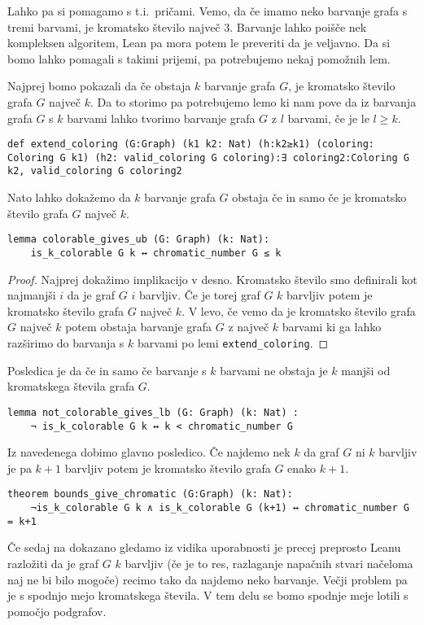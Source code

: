 \documentclass[mat1]{fmfdelo}
\begin{document}
Lahko pa si pomagamo s t.i.\ pričami. Vemo, da če imamo neko barvanje grafa s tremi barvami, je kromatsko število največ 3. 
Barvanje lahko poišče nek kompleksen algoritem, Lean pa mora potem le preveriti da je veljavno. Da si bomo lahko pomagali s takimi
prijemi, pa potrebujemo nekaj pomožnih lem. 

Najprej bomo pokazali da če obstaja $k$ barvanje grafa $G$, je kromatsko število grafa $G$ največ $k$. Da to storimo pa potrebujemo
lemo ki nam pove da iz barvanja grafa $G$ s $k$ barvami lahko tvorimo barvanje grafa $G$ z $l$ barvami, če je le $l\geq k$.
\begin{lstlisting}
def extend_coloring (G:Graph) (k1 k2: Nat) (h:k2≥k1) (coloring: Coloring G k1) (h2: valid_coloring G coloring):∃ coloring2:Coloring G k2, valid_coloring G coloring2
\end{lstlisting}
Nato lahko dokažemo da $k$ barvanje grafa $G$ obstaja če in samo če je kromatsko število grafa $G$ največ $k$.
\begin{lstlisting}
lemma colorable_gives_ub (G: Graph) (k: Nat):
    is_k_colorable G k ↔ chromatic_number G ≤ k
\end{lstlisting}
\begin{proof}
Najprej dokažimo implikacijo v desno. Kromatsko število smo definirali kot najmanjši $i$ da je graf $G$ $i$ barvljiv.
Če je torej graf $G$ $k$ barvljiv potem je kromatsko število grafa $G$ največ $k$.
V levo, če vemo da je kromatsko število grafa $G$ največ $k$ potem obstaja barvanje grafa $G$ z največ $k$ barvami
ki ga lahko razširimo do barvanja s $k$ barvami po lemi \lstinline{extend_coloring}.
\end{proof}

Posledica je da če in samo če barvanje s $k$ barvami ne obstaja je $k$ manjši od kromatskega števila grafa $G$.
\begin{lstlisting}
lemma not_colorable_gives_lb (G: Graph) (k: Nat) :
    ¬ is_k_colorable G k ↔ k < chromatic_number G
\end{lstlisting}

Iz navedenega dobimo glavno posledico.
Če najdemo nek $k$ da graf $G$ ni $k$ barvljiv je pa $k+1$ barvljiv potem je kromatsko število grafa $G$ enako $k+1$.
\begin{lstlisting}
theorem bounds_give_chromatic (G:Graph) (k: Nat):
    ¬is_k_colorable G k ∧ is_k_colorable G (k+1) ↔ chromatic_number G = k+1
\end{lstlisting}

Če sedaj na dokazano gledamo iz vidika uporabnosti je precej preprosto Leanu razložiti da je graf $G$ $k$ barvljiv
(če je to res, razlaganje napačnih stvari načeloma naj ne bi bilo mogoče) recimo tako da najdemo neko barvanje. Večji problem pa je
s spodnjo mejo kromatskega števila. 
V tem delu se bomo spodnje meje lotili s pomočjo podgrafov.
\end{document}
